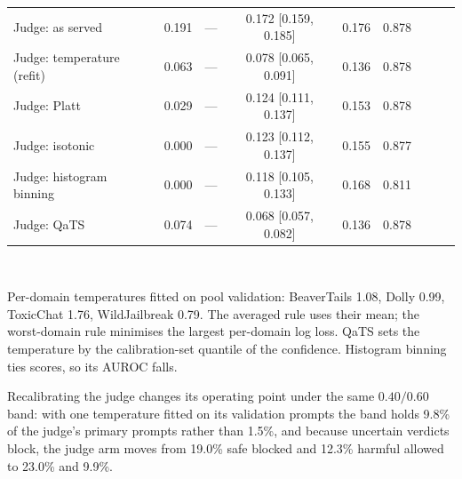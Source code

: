 \begin{table}[!htbp]
\begin{tabular}{@{}lccccc ccc@{}}
\midrule
Judge: as served & 0.191 & --- & 0.172 [0.159, 0.185] & 0.176 & 0.878 & & &  \\
Judge: temperature (refit) & 0.063 & --- & 0.078 [0.065, 0.091] & 0.136 & 0.878 & & &  \\
Judge: Platt & 0.029 & --- & 0.124 [0.111, 0.137] & 0.153 & 0.878 & & &  \\
Judge: isotonic & 0.000 & --- & 0.123 [0.112, 0.137] & 0.155 & 0.877 & & &  \\
Judge: histogram binning & 0.000 & --- & 0.118 [0.105, 0.133] & 0.168 & 0.811 & & &  \\
Judge: QaTS & 0.074 & --- & 0.068 [0.057, 0.082] & 0.136 & 0.878 & & &  \\
\bottomrule
\end{tabular}
\\[2pt]
\parbox{\linewidth}{\scriptsize Per-domain temperatures fitted on pool validation: BeaverTails 1.08, Dolly 0.99, ToxicChat 1.76, WildJailbreak 0.79. The averaged rule uses their mean; the worst-domain rule minimises the largest per-domain log loss. QaTS sets the temperature by the calibration-set quantile of the confidence. Histogram binning ties scores, so its AUROC falls.}
\end{table}

Recalibrating the judge changes its operating point under the same $0.40/0.60$ band: with one temperature fitted on its validation prompts the band holds 9.8\% of the judge's primary prompts rather than 1.5\%, and because uncertain verdicts block, the judge arm moves from 19.0\% safe blocked and 12.3\% harmful allowed to 23.0\% and 9.9\%.

